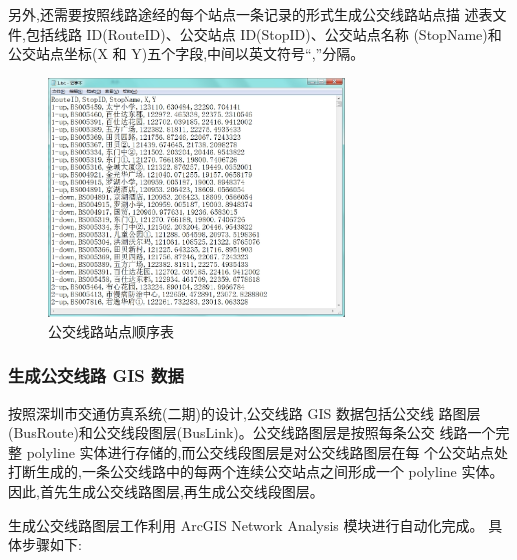 另外,还需要按照线路途经的每个站点一条记录的形式生成公交线路站点描
述表文件,包括线路 ID(RouteID)、公交站点 ID(StopID)、公交站点名称
(StopName)和公交站点坐标(X 和 Y)五个字段,中间以英文符号“,”分隔。

\begin{figure}[ht]
  \centering
  \includegraphics[width=0.7\textwidth]{figures/chp02_公交线路站点顺序表.jpg}
  \caption{公交线路站点顺序表\label{fig:公交线路站点顺序表} }
\end{figure}

\subsubsection{生成公交线路 GIS 数据}
按照深圳市交通仿真系统(二期)的设计,公交线路 GIS 数据包括公交线
路图层(BusRoute)和公交线段图层(BusLink)。公交线路图层是按照每条公交
线路一个完整 polyline 实体进行存储的,而公交线段图层是对公交线路图层在每
个公交站点处打断生成的,一条公交线路中的每两个连续公交站点之间形成一个
polyline 实体。因此,首先生成公交线路图层,再生成公交线段图层。

生成公交线路图层工作利用 ArcGIS Network Analysis 模块进行自动化完成。
具体步骤如下:

